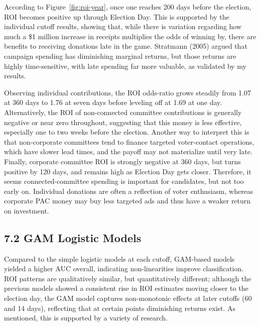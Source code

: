 \indent According to Figure~\ref{fig:roi-year}, once one reaches 200 days before the election, ROI becomes positive up through Election Day. This is supported by the individual cutoff results, showing that, while there is variation regarding how much a \$1 million increase in receipts multiplies the odds of winning by, there are benefits to receiving donations late in the game. Stratmann (2005) argued that campaign spending has diminishing marginal returns, but those returns are highly time-sensitive, with late spending far more valuable, as validated by my results.

\indent Observing individual contributions, the ROI odds-ratio grows steadily from 1.07 at 360 days to 1.76 at seven days before leveling off at 1.69 at one day. Alternatively, the ROI of non-connected committee contributions is generally negative or near zero throughout, suggesting that this money is less effective, especially one to two weeks before the election. Another way to interpret this is that non-corporate committees tend to finance targeted voter-contact operations, which have slower lead times, and the payoff may not materialize until very late. Finally, corporate committee ROI is strongly negative at 360 days, but turns positive by 120 days, and remains high as Election Day gets closer. Therefore, it seems connected-committee spending is important for candidates, but not too early on. Individual donations are often a reflection of voter enthusiasm, whereas corporate PAC money may buy less targeted ads and thus have a weaker return on investment. 

\subsection*{7.2 GAM Logistic Models}

Compared to the simple logistic models at each cutoff, GAM-based models yielded a higher AUC overall, indicating non-linearities improve classification. ROI patterns are qualitatively similar, but quantitatively different; although the previous models showed a consistent rise in ROI estimates moving closer to the election day, the GAM model captures non-monotonic effects at later cutoffs (60 and 14 days), reflecting that at certain points diminishing returns exist. As mentioned, this is supported by a variety of research.

